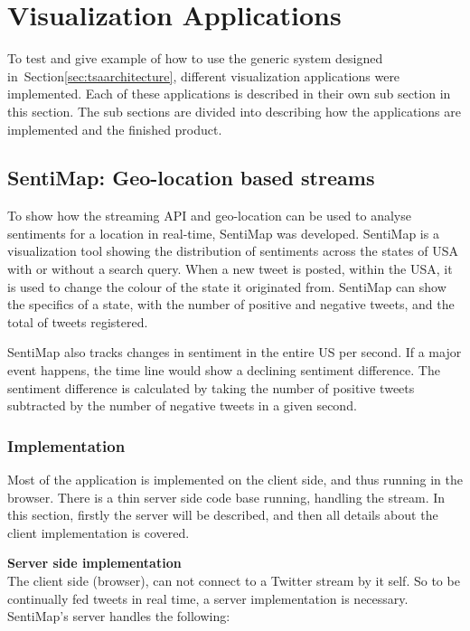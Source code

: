 \section{Visualization Applications}
\label{sec:visualization_applications}
To test and give example of how to use the generic system designed in~Section\ref{sec:tsaarchitecture}, different visualization applications were implemented. Each of these applications is described in their own sub section in this section. The sub sections are divided into describing how the applications are implemented and the finished product.

\subsection{SentiMap: Geo-location based streams}

To show how the streaming API and geo-location can be used to analyse sentiments for a location in real-time, SentiMap was developed. SentiMap is a visualization tool showing the distribution of sentiments across the states of USA with or without a search query. When a new tweet is posted, within the USA, it is used to change the colour of the state it originated from. SentiMap can show the specifics of a state, with the number of positive and negative tweets, and the total of tweets registered.

SentiMap also tracks changes in sentiment in the entire US per second. If a major event happens, the time line would show a declining sentiment difference. The sentiment difference is calculated by taking the number of positive tweets subtracted by the number of negative tweets in a given second. 

\subsubsection{Implementation}

Most of the application is implemented on the client side, and thus running in the browser. There is a thin server side code base running, handling the stream. In this section, firstly the server will be described, and then all details about the client implementation is covered. 


\textbf{Server side implementation} \\

The client side (browser), can not connect to a Twitter stream by it self. So to be continually fed tweets in real time, a server implementation is necessary. SentiMap's server handles the following:

